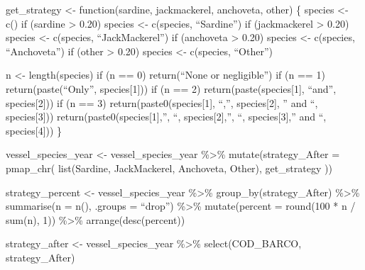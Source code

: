 get\_strategy \textless- function(sardine, jackmackerel, anchoveta,
other) \{ species \textless- c() if (sardine \textgreater{} 0.20)
species \textless- c(species, ``Sardine'') if (jackmackerel
\textgreater{} 0.20) species \textless- c(species, ``JackMackerel'') if
(anchoveta \textgreater{} 0.20) species \textless- c(species,
``Anchoveta'') if (other \textgreater{} 0.20) species \textless-
c(species, ``Other'')

n \textless- length(species) if (n == 0) return(``None or negligible'')
if (n == 1) return(paste(``Only'', species{[}1{]})) if (n == 2)
return(paste(species{[}1{]}, ``and'', species{[}2{]})) if (n == 3)
return(paste0(species{[}1{]}, ``,'', species{[}2{]}, '' and ``,
species{[}3{]})) return(paste0(species{[}1{]},'', ``, species{[}2{]},'',
``, species{[}3{]},'' and ``, species{[}4{]})) \}

vessel\_species\_year \textless- vessel\_species\_year \%\textgreater\%
mutate(strategy\_After = pmap\_chr( list(Sardine, JackMackerel,
Anchoveta, Other), get\_strategy ))

strategy\_percent \textless- vessel\_species\_year \%\textgreater\%
group\_by(strategy\_After) \%\textgreater\% summarise(n = n(), .groups =
``drop'') \%\textgreater\% mutate(percent = round(100 * n / sum(n), 1))
\%\textgreater\% arrange(desc(percent))

strategy\_after \textless- vessel\_species\_year \%\textgreater\%
select(COD\_BARCO, strategy\_After)

